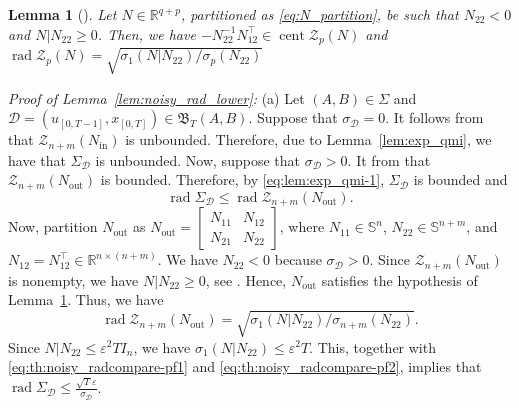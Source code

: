 \documentclass[journal,twoside,web]{ieeecolor}
\DeclareMathOperator{\rad}{rad}
\DeclareMathOperator{\cent}{cent}
\newtheorem{lemma}[theorem]{Lemma}
\begin{document}
\begin{lemma}[{\cite[Thm. 7]{shakouri2025chebyshev}}]
\label{lem:radcent_qmi}
Let $N\in\mathbb{R}^{q+p}$, partitioned as \eqref{eq:N_partition}, be such that $N_{22}< 0$ and $N|N_{22}\geq 0$. Then, we have $-N_{22}^{-1}N_{12}^\top\in\cent \mathcal{Z}_p(N)$ and $\rad \mathcal{Z}_p(N) = \sqrt{\sigma_1(N|N_{22})/\sigma_p(N_{22})}$
\end{lemma}

\textit{Proof of Lemma~\ref{lem:noisy_rad_lower}:}
(a) Let $(A,B)\in\Sigma$ and \mbox{$\mathcal{D}=(u_{[0,T-1]},x_{[0,T]})\in\mathfrak{B}_T(A,B)$}. Suppose that $\sigma_\mathcal{D}=0$. It follows from \cite[Thm. 3.2(b)]{HenkQMI2023} that $\mathcal{Z}_{n+m}(N_\text{in})$ is unbounded. Therefore, due to Lemma~\ref{lem:exp_qmi}, we have that $\Sigma_\mathcal{D}$ is unbounded. Now, suppose that $\sigma_\mathcal{D}>0$. It from \cite[Thm. 3.2(b)]{HenkQMI2023} that $\mathcal{Z}_{n+m}(N_\text{out})$ is bounded. Therefore, by \eqref{eq:lem:exp_qmi-1}, $\Sigma_\mathcal{D}$ is bounded and
\begin{equation}
\label{eq:th:noisy_radcompare-pf1}
\rad\Sigma_\mathcal{D}\leq\rad\mathcal{Z}_{n+m}(N_\text{out}).
\end{equation}
Now, partition $N_\text{out}$ as $N_\text{out}=\begin{bmatrix}
N_{11} & N_{12} \\
N_{21} & N_{22}
\end{bmatrix}$, where \mbox{$N_{11}\in\mathbb{S}^n$}, $N_{22}\in\mathbb{S}^{n+m}$, and $N_{12}=N_{12}^\top\in\mathbb{R}^{n\times (n+m)}$. We have $N_{22}<0$ because $\sigma_\mathcal{D}>0$. Since $\mathcal{Z}_{n+m}(N_\text{out})$ is nonempty, we have \mbox{$N|N_{22}\geq 0$}, see \cite[p. 2257]{HenkQMI2023}. Hence, $N_\text{out}$ satisfies the hypothesis of Lemma~\ref{lem:radcent_qmi}. Thus, we have
\begin{equation}
\label{eq:th:noisy_radcompare-pf2}
\rad \mathcal{Z}_{n+m}(N_\text{out})=\sqrt{\sigma_1(N|N_{22})/\sigma_{n+m}(N_{22})}.
\end{equation}
Since $N|N_{22}\leq\varepsilon^2 T I_n$, we have $\sigma_1(N|N_{22})\leq \varepsilon^2 T$. This, together with \eqref{eq:th:noisy_radcompare-pf1} and \eqref{eq:th:noisy_radcompare-pf2}, implies that $\rad\Sigma_\mathcal{D}\leq \frac{\sqrt{T}\varepsilon}{\sigma_\mathcal{D}}$. 
\end{document}
